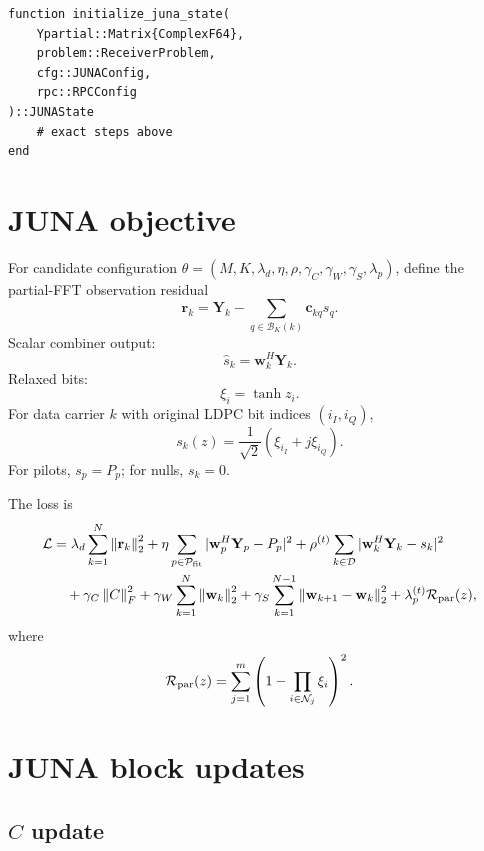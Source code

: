 \documentclass[11pt]{article}
\newcommand{\norm}[1]{\left\lVert #1 \right\rVert}
\begin{document}
\begin{lstlisting}
function initialize_juna_state(
    Ypartial::Matrix{ComplexF64},
    problem::ReceiverProblem,
    cfg::JUNAConfig,
    rpc::RPCConfig
)::JUNAState
    # exact steps above
end
\end{lstlisting}

\clearpage
\section{JUNA objective}

For candidate configuration $\theta=(M,K,\lambda_d,\eta,\rho,\gamma_C,\gamma_W,\gamma_S,\lambda_p)$, define the partial-FFT observation residual
\begin{equation}
\mathbf r_k=\mathbf Y_k-\sum_{q\in\mathcal B_K(k)}\mathbf c_{kq}s_q.
\end{equation}
Scalar combiner output:
\begin{equation}
\hat s_k=\mathbf w_k^H\mathbf Y_k.
\end{equation}
Relaxed bits:
\begin{equation}
\xi_i=\tanh z_i.
\end{equation}
For data carrier $k$ with original LDPC bit indices $(i_I,i_Q)$,
\begin{equation}
s_k(z)=\frac{1}{\sqrt2}(\xi_{i_I}+j\xi_{i_Q}).
\end{equation}
For pilots, $s_p=P_p$; for nulls, $s_k=0$.

The loss is
\begin{align}
\mathcal L &=
\lambda_d\sum_{k=1}^N\norm{\mathbf r_k}_2^2
+\eta\sum_{p\in\mathcal P_{\rm fit}}|\mathbf w_p^H\mathbf Y_p-P_p|^2
+\rho^{(t)}\sum_{k\in\mathcal D}|\mathbf w_k^H\mathbf Y_k-s_k|^2\nonumber\\
&\quad+\gamma_C\norm{C}_F^2
+\gamma_W\sum_{k=1}^N\norm{\mathbf w_k}_2^2
+\gamma_S\sum_{k=1}^{N-1}\norm{\mathbf w_{k+1}-\mathbf w_k}_2^2
+\lambda_p^{(t)}\mathcal R_{\rm par}(z),
\end{align}
where
\begin{equation}
\mathcal R_{\rm par}(z)=\sum_{j=1}^{m}\left(1-\prod_{i\in\mathcal N_j}\xi_i\right)^2.
\end{equation}

\clearpage
\section{JUNA block updates}

\subsection{$C$ update}
\end{document}
